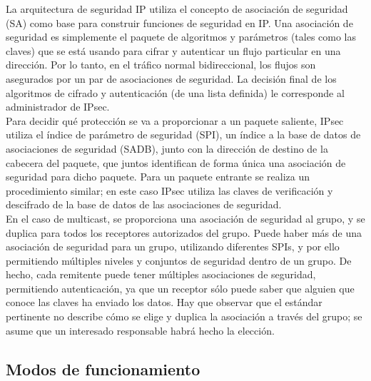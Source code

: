 \documentclass[a4paper,10pt]{article}
\begin{document}
	\indent La arquitectura de seguridad IP utiliza el concepto de asociación de seguridad (SA) como base para construir funciones de seguridad en IP. Una asociación de seguridad es simplemente el paquete de algoritmos y parámetros (tales como las claves) que se está usando para cifrar y autenticar un flujo particular en una dirección. Por lo tanto, en el tráfico normal bidireccional, los flujos son asegurados por un par de asociaciones de seguridad. La decisión final de los algoritmos de cifrado y autenticación (de una lista definida) le corresponde al administrador de IPsec. \\
	\indent Para decidir qué protección se va a proporcionar a un paquete saliente, IPsec utiliza el índice de parámetro de seguridad (SPI), un índice a la base de datos de asociaciones de seguridad (SADB), junto con la dirección de destino de la cabecera del paquete, que juntos identifican de forma única una asociación de seguridad para dicho paquete. Para un paquete entrante se realiza un procedimiento similar; en este caso IPsec utiliza las claves de verificación y descifrado de la base de datos de las asociaciones de seguridad. \\
	\indent En el caso de multicast, se proporciona una asociación de seguridad al grupo, y se duplica para todos los receptores autorizados del grupo. Puede haber más de una asociación de seguridad para un grupo, utilizando diferentes SPIs, y por ello permitiendo múltiples niveles y conjuntos de seguridad dentro de un grupo. De hecho, cada remitente puede tener múltiples asociaciones de seguridad, permitiendo autenticación, ya que un receptor sólo puede saber que alguien que conoce las claves ha enviado los datos. Hay que observar que el estándar pertinente no describe cómo se elige y duplica la asociación a través del grupo; se asume que un interesado responsable habrá hecho la elección.
	
	
	
	
		\subsection{Modos de funcionamiento}
\end{document}

